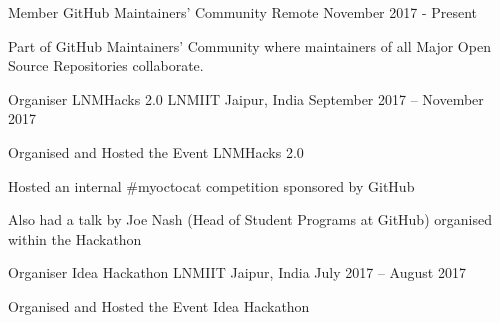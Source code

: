 \begin{cventries}
  \cventry
    {Member}
    {GitHub Maintainers' Community}
    {Remote}
    {November 2017 - Present}
    {\begin{cvitems}
        {Part of GitHub Maintainers' Community where maintainers of all Major Open Source Repositories collaborate.}
    \end{cvitems}}
  \cventry
	{Organiser}
	{LNMHacks 2.0}
	{LNMIIT Jaipur, India}
	{September 2017 – November 2017}
	{\begin{cvitems}
		\item {Organised and Hosted the Event LNMHacks 2.0}
		\item {Hosted an internal \#myoctocat competition sponsored by GitHub}
		\item {Also had a talk by Joe Nash (Head of Student Programs at GitHub) organised within the Hackathon}
		\end{cvitems}}
  \cventry
	{Organiser}
	{Idea Hackathon}
	{LNMIIT Jaipur, India}
	{July 2017 – August 2017}
	{\begin{cvitems}
	{Organised and Hosted the Event Idea Hackathon}
    \end{cvitems}}
\end{cventries}
